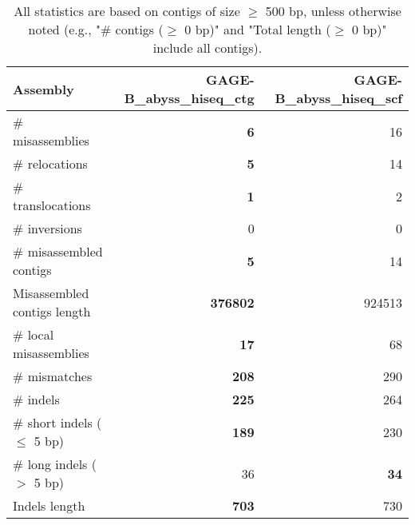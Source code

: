 \documentclass[12pt,a4paper]{article}
\begin{document}
\begin{table}[ht]
\begin{center}
\caption{All statistics are based on contigs of size $\geq$ 500 bp, unless otherwise noted (e.g., "\# contigs ($\geq$ 0 bp)" and "Total length ($\geq$ 0 bp)" include all contigs).}
\begin{tabular}{|l*{2}{|r}|}
\hline
Assembly & GAGE-B\_abyss\_hiseq\_ctg & GAGE-B\_abyss\_hiseq\_scf \\ \hline
\# misassemblies & {\bf 6} & 16 \\ \hline
\hspace{5mm}\# relocations & {\bf 5} & 14 \\ \hline
\hspace{5mm}\# translocations & {\bf 1} & 2 \\ \hline
\hspace{5mm}\# inversions & 0 & 0 \\ \hline
\# misassembled contigs & {\bf 5} & 14 \\ \hline
Misassembled contigs length & {\bf 376802} & 924513 \\ \hline
\# local misassemblies & {\bf 17} & 68 \\ \hline
\# mismatches & {\bf 208} & 290 \\ \hline
\# indels & {\bf 225} & 264 \\ \hline
\hspace{5mm}\# short indels ($\leq$ 5 bp) & {\bf 189} & 230 \\ \hline
\hspace{5mm}\# long indels ($>$ 5 bp) & 36 & {\bf 34} \\ \hline
Indels length & {\bf 703} & 730 \\ \hline
\end{tabular}
\end{center}
\end{table}
\end{document}
